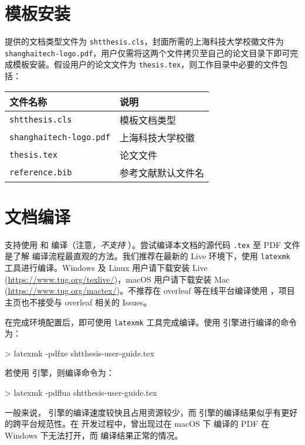 \documentclass[
  fontset = mac,
]{shtthesis}
\begin{document}
\section{模板安装}
\shtthesis 提供的文档类型文件为 \verb|shtthesis.cls|，封面所需的上海科技大学校徽文件为 \verb|shanghaitech-logo.pdf|，用户仅需将这两个文件拷贝至自己的论文目录下即可完成模板安装。假设用户的论文文件为 \verb|thesis.tex|，则工作目录中必要的文件包括：
\begin{center}
  \begin{tabular}{ll}
    \toprule
    文件名称 & 说明 \\
    \midrule 
    \verb|shtthesis.cls| & 模板文档类型 \\
    \verb|shanghaitech-logo.pdf| & 上海科技大学校徽 \\
    \verb|thesis.tex| & 论文文件 \\
    \verb|reference.bib| & 参考文献默认文件名 \\
    \bottomrule
  \end{tabular}
\end{center}

\section{文档编译}
\shtthesis 支持使用  和  编译（注意，\emph{不支持} ）。尝试编译本文档的源代码 \texttt{\jobname.tex} 至 PDF 文件是了解 \shtthesis 编译流程最直观的方法。我们推荐在最新的  Live 环境下，使用 \verb|latexmk| 工具进行编译。Windows 及 Linux 用户请下载安装  Live (\url{https://www.tug.org/texlive/})，macOS 用户请下载安装 Mac (\url{https://www.tug.org/mactex/})。不推荐在 overleaf 等在线平台编译使用 \shtthesis，项目主页也不接受与 overleaf 相关的 Issues。

在完成环境配置后，即可使用 \verb|latexmk| 工具完成编译。使用  引擎进行编译的命令为：
\begin{shell}
> latexmk -pdfxe shtthesis-user-guide.tex
\end{shell}
若使用  引擎，则编译命令为：
\begin{shell}
> latexmk -pdflua shtthesis-user-guide.tex
\end{shell}
一般来说， 引擎的编译速度较快且占用资源较少，而  引擎的编译结果似乎有更好的跨平台规范性。在 \shtthesis 开发过程中，曾出现过在 macOS 下  编译的 PDF 在 Windows 下无法打开，而  编译结果正常的情况。
\end{document}
